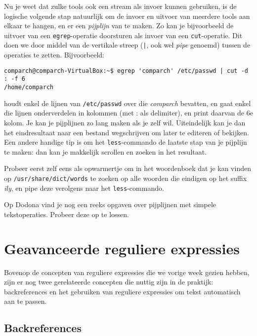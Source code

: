\documentclass[a4paper,twoside,openany]{memoir}
\begin{document}
Nu je weet dat zulke tools ook een stream als invoer kunnen gebruiken, is de
logische volgende stap natuurlijk om de invoer en uitvoer van meerdere tools aan
elkaar te hangen, en er een \emph{pijplijn} van te maken. Zo kan je bijvoorbeeld
de uitvoer van een \verb!egrep!-operatie doorsturen als invoer van een
\verb!cut!-operatie. Dit doen we door middel van de vertikale streep (\verb!|!,
ook wel \emph{pipe} genoemd) tussen de operaties te zetten. Bijvoorbeeld:
\begin{verbatim}
comparch@comparch-VirtualBox:~$ egrep 'comparch' /etc/passwd | cut -d : -f 6
/home/comparch
\end{verbatim}

houdt enkel de lijnen van \verb!/etc/passwd! over die \emph{comparch} bevatten,
en gaat enkel die lijnen onderverdelen in kolommen (met : als delimiter), en
print daarvan de 6e kolom. Je kan je pijplijnen zo lang maken als je zelf wil.
Uiteindelijk kan je dan het eindresultaat naar een bestand wegschrijven om later
te editeren of bekijken. Een andere handige tip is om het \verb!less!-commando
de laatste stap van je pijplijn te maken: dan kan je makkelijk scrollen en
zoeken in het resultaat.

Probeer eerst zelf eens als opwarmertje om in het woordenboek dat je kan vinden
op \verb!/usr/share/dict/words! te zoeken op alle woorden die eindigen op het
suffix \emph{ily}, en pipe deze verolgens naar het \verb!less!-commando.

Op Dodona vind je nog een reeks opgaven over pijplijnen met simpele
tekstoperaties. Probeer deze op te lossen.

\chapter{Geavanceerde reguliere expressies}

Bovenop de concepten van reguliere expressies die we vorige week gezien hebben,
zijn er nog twee gerelateerde concepten die nuttig zijn in de praktijk:
backreferences en het gebruiken van reguliere expressies om tekst automatisch
aan te passen.

\section{Backreferences}
\end{document}
